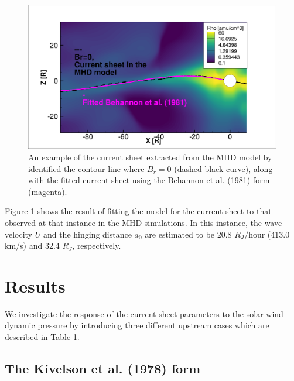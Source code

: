 \begin{figure}
    \centering
    \includegraphics[width=\textwidth]{images5/CurrentSheet_fitted.png}
    \caption{An example of the current sheet extracted from the MHD model  by identified the contour line where $B_r=0$ (dashed black curve), along with the fitted current sheet using the Behannon et al. (1981) form (magenta).}
    \label{fig:example-fitcurrentsheet}
\end{figure}

Figure \ref{fig:example-fitcurrentsheet} shows the result of fitting the  model for the current sheet to that observed at that instance in the MHD simulations. In this instance, the wave velocity $U$ and the hinging distance $a_0$ are estimated to be 20.8 $R_J$/hour (413.0 km/s) and 32.4 $R_J$, respectively. 

\section{Results}

We investigate the response of the current sheet parameters to the solar wind dynamic pressure by introducing three different upstream cases which are described in Table 1. 

\subsection{The Kivelson et al. (1978) form}

